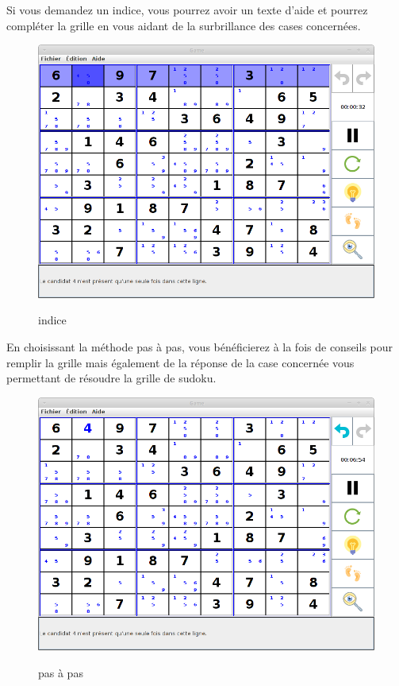 \newpage
Si vous demandez un indice, vous pourrez avoir un texte d'aide 
et pourrez compléter la grille en vous aidant de la surbrillance 
des cases concernées.  
\begin{figure}[ht]
  \caption{\label{annexe13} indice}
  \includegraphics [width=130mm]{images/clue.png} \\[0.5cm]
\end{figure}

\newpage
En choisissant la méthode pas à pas, vous bénéficierez à la fois de conseils
pour remplir la grille mais également de la réponse de la case concernée 
vous permettant de résoudre la grille de sudoku. 
\begin{figure}[ht]
  \caption{\label{annexe14} pas à pas}
  \includegraphics [width=130mm]{images/pas.png} \\[0.5cm]
\end{figure}

